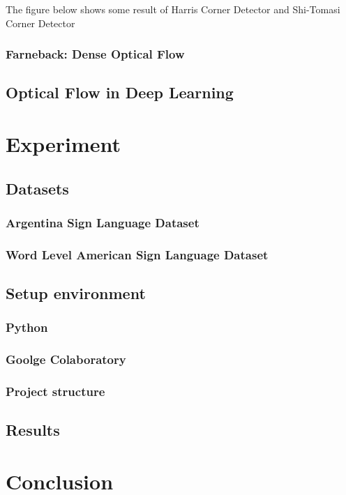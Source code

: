 \documentclass[a4paper, 12pt]{article}
\begin{document}
The figure below shows some result of Harris Corner Detector and Shi-Tomasi Corner Detector

\subsubsection{Farneback: Dense Optical Flow}
\subsection{Optical Flow in Deep Learning}

\section{Experiment}
\subsection{Datasets}
\subsubsection{Argentina Sign Language Dataset}
\subsubsection{Word Level American Sign Language Dataset}
\subsection{Setup environment}
\subsubsection{Python}
\subsubsection{Goolge Colaboratory}
\subsubsection{Project structure}
\subsection{Results}

\section{Conclusion}


\newpage

\newpage


\end{document}
